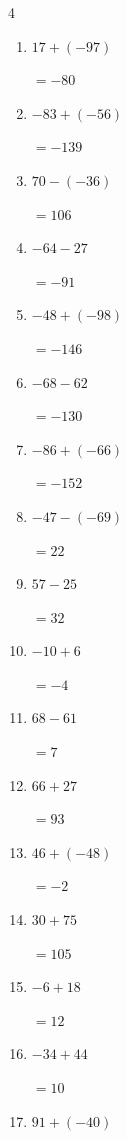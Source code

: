 \begin{multicols}{4}
\begin{enumerate}
        $=31$

  \item $17+(-97)$

        $=-80$

  \item $-83+(-56)$

        $=-139$

  \item $70-(-36)$

        $=106$

  \item $-64-27$

        $=-91$

  \item $-48+(-98)$

        $=-146$

  \item $-68-62$

        $=-130$

  \item $-86+(-66)$

        $=-152$

  \item $-47-(-69)$

        $=22$

  \item $57-25$

        $=32$

\columnbreak %

  \item $-10+6$

        $=-4$

  \item $68-61$

        $=7$

  \item $66+27$

        $=93$

  \item $46+(-48)$

        $=-2$

  \item $30+75$

        $=105$

  \item $-6+18$

        $=12$

  \item $-34+44$

        $=10$

  \item $91+(-40)$


\end{enumerate}
\end{multicols}
